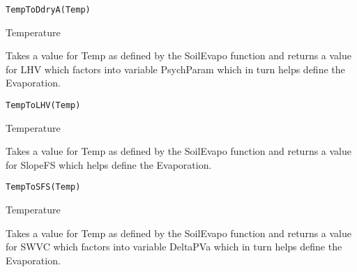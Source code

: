 \documentclass[letterpaper]{book}
\begin{document}
%
\begin{Usage}
\begin{verbatim}
TempToDdryA(Temp)
\end{verbatim}
\end{Usage}
%
\begin{Arguments}
\begin{ldescription}
\item[\code{Temp}] Temperature
\end{ldescription}
\end{Arguments}
%
\begin{Description}\relax
Takes a value for Temp as defined by the SoilEvapo function
and returns a value for LHV which factors into variable
PsychParam which in turn helps define the Evaporation.
\end{Description}
%
\begin{Usage}
\begin{verbatim}
TempToLHV(Temp)
\end{verbatim}
\end{Usage}
%
\begin{Arguments}
\begin{ldescription}
\item[\code{Temp}] Temperature
\end{ldescription}
\end{Arguments}
%
\begin{Description}\relax
Takes a value for Temp as defined by the SoilEvapo function
and returns a value for SlopeFS which helps define the
Evaporation.
\end{Description}
%
\begin{Usage}
\begin{verbatim}
TempToSFS(Temp)
\end{verbatim}
\end{Usage}
%
\begin{Arguments}
\begin{ldescription}
\item[\code{Temp}] Temperature
\end{ldescription}
\end{Arguments}
%
\begin{Description}\relax
Takes a value for Temp as defined by the SoilEvapo function
and returns a value for SWVC which factors into variable
DeltaPVa which in turn helps define the Evaporation.
\end{Description}
\end{document}
